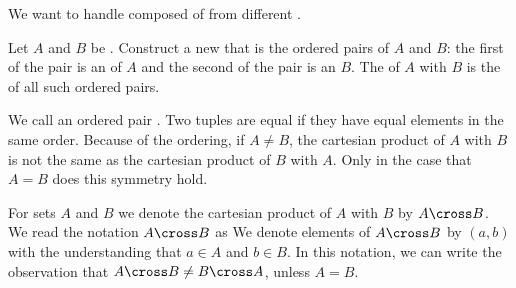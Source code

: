 
\sbasic



\sstart



We want to handle 
composed of  from
different .


Let $A$ and $B$ be .
Construct a new  that is the
ordered pairs of 
$A$ and $B$: the first 
of the pair is an  of
$A$ and the second  of
the pair is an  $B$.
The 
of $A$ with $B$ is the  of all
such ordered pairs.

We call an ordered pair .
Two tuples are equal if they have equal elements in the same order.
Because of the ordering, if $A \neq B$, the cartesian product of $A$ with $B$
is not the same as the cartesian product of $B$ with $A$.
Only in the case that $A = B$ does this symmetry hold.

For sets $A$ and $B$ we denote the cartesian product of
$A$ with $B$ by $A \cross B$.
We read the notation $A \cross B$ as 
We denote elements of $A \cross B$ by $(a, b)$ with the
understanding that $a \in A$ and $b \in B$.
In this notation, we can write the observation that
$A \cross B \neq B \cross A$, unless $A = B$.

\strats
